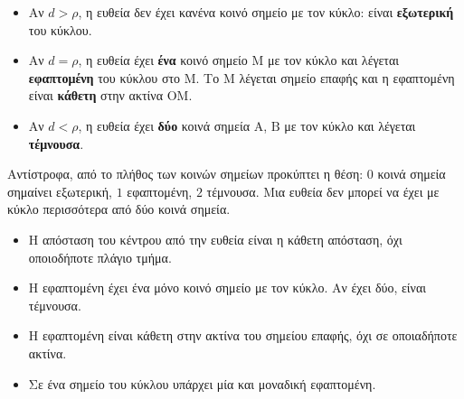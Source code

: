 \begin{center}
\end{center}

\begin{itemize}[leftmargin=1.2em,itemsep=0.3ex,topsep=2pt]
\item Αν $d>\rho$, η ευθεία δεν έχει κανένα κοινό σημείο με τον κύκλο: είναι \textbf{εξωτερική} του κύκλου.
\item Αν $d=\rho$, η ευθεία έχει \textbf{ένα} κοινό σημείο $\mathrm{Μ}$ με τον κύκλο και λέγεται \textbf{εφαπτομένη} του κύκλου στο $\mathrm{Μ}$. Το $\mathrm{Μ}$ λέγεται σημείο επαφής και η εφαπτομένη είναι \textbf{κάθετη} στην ακτίνα $\mathrm{ΟΜ}$.
\item Αν $d<\rho$, η ευθεία έχει \textbf{δύο} κοινά σημεία $\mathrm{Α}$, $\mathrm{Β}$ με τον κύκλο και λέγεται \textbf{τέμνουσα}.
\end{itemize}

Αντίστροφα, από το πλήθος των κοινών σημείων προκύπτει η θέση: $0$ κοινά σημεία σημαίνει εξωτερική, $1$ εφαπτομένη, $2$ τέμνουσα. Μια ευθεία δεν μπορεί να έχει με κύκλο περισσότερα από δύο κοινά σημεία.

\begin{prosoxi}
\begin{itemize}[leftmargin=1.2em,itemsep=0.3ex,topsep=2pt]
\item Η απόσταση του κέντρου από την ευθεία είναι η κάθετη απόσταση, όχι οποιοδήποτε πλάγιο τμήμα.
\item Η εφαπτομένη έχει ένα μόνο κοινό σημείο με τον κύκλο. Αν έχει δύο, είναι τέμνουσα.
\item Η εφαπτομένη είναι κάθετη στην ακτίνα του σημείου επαφής, όχι σε οποιαδήποτε ακτίνα.
\item Σε ένα σημείο του κύκλου υπάρχει μία και μοναδική εφαπτομένη.
\end{itemize}
\end{prosoxi}

